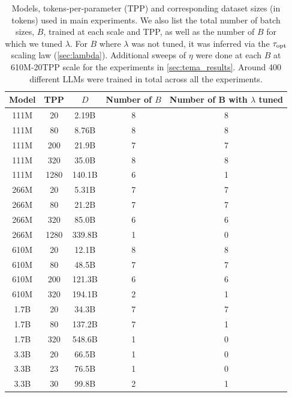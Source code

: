 \begin{table}
  \centering
  \caption{Models, tokens-per-parameter (TPP) and corresponding
    dataset sizes (in tokens) used in main experiments.  We also list
    the total number of batch sizes, $B$, trained at each scale and
    TPP, as well as the number of $B$ for which we tuned $\lambda$.
    For $B$ where $\lambda$ was not tuned, it was inferred via the
    ${\tau}_{\text{opt}}$ scaling law (\cref{sec:lambda}).  Additional sweeps
    of $\eta$ were done at each $B$ at 610M-20TPP scale for the
    experiments in \cref{sec:tema_results}. Around 400 different LLMs
    were trained in total across all the
    experiments.\label{tab:train_steps}}
\begin{tabular}{@{}ccccc@{}}
\toprule
Model & TPP  & $D$ & Number of $B$ & Number of B with $\lambda$ tuned \\ \midrule
111M  & 20   & 2.19B & 8 & 8 \\
111M  & 80  & 8.76B & 8 & 8 \\
111M  & 200  & 21.9B & 7 & 7 \\
111M  & 320  & 35.0B & 8 & 8 \\
111M  & 1280  & 140.1B & 6 & 1 \\
266M  & 20   & 5.31B & 7 & 7 \\
266M  & 80   & 21.2B & 7 & 7 \\
266M  & 320   & 85.0B & 6 & 6 \\
266M  & 1280   & 339.8B & 1 & 0 \\
610M  & 20  & 12.1B & 8 & 8  \\
610M  & 80 & 48.5B & 7 & 7   \\
610M  & 200 & 121.3B & 6 & 6 \\
610M  & 320 & 194.1B & 2 & 1   \\
1.7B  & 20  & 34.3B & 7 & 7   \\
1.7B  & 80  & 137.2B & 7 & 1   \\
1.7B  & 320  & 548.6B & 1 & 0   \\
3.3B  & 20  & 66.5B & 1 & 0   \\
3.3B  & 23  & 76.5B & 1 & 0   \\
3.3B  & 30  & 99.8B & 2 & 1   \\ \bottomrule
\end{tabular}
\end{table}
